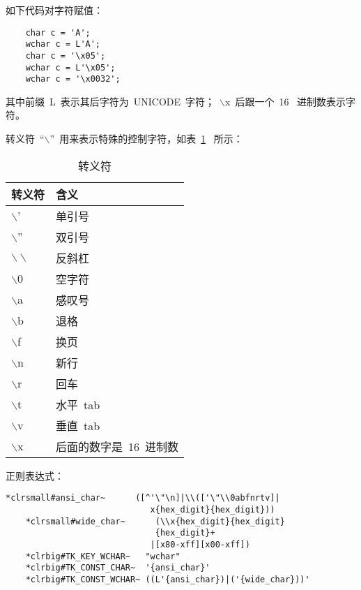 如下代码对字符赋值：


\ttfamily
\begin{lstlisting}
    char c = 'A';
    wchar c = L'A';
    char c = '\x05';
    wchar c = L'\x05';
    wchar c = '\x0032';
\end{lstlisting}

其中前缀~L~表示其后字符为~UNICODE~字符；~$\backslash$x~后跟一个~16~
进制数表示字符。

转义符~``$\backslash$''~用来表示特殊的控制字符，如表~\ref{tab_esc}~
所示：

\begin{table}[h]
  \centering
  \caption{转义符}\label{tab_esc}
  \vspace{1.5ex}
\begin{tabular}{|l|l|}
  \hline
  \textbf{转义符} & \textbf{含义} \\
  \hline\hline
  $\backslash$' & 单引号 \\
  \hline
  $\backslash$'' & 双引号 \\
  \hline
  $\backslash\backslash$ & 反斜杠 \\
  \hline
  $\backslash$0 & 空字符 \\
  \hline
  $\backslash$a & 感叹号 \\
  \hline
  $\backslash$b & 退格 \\
  \hline
  $\backslash$f & 换页 \\
  \hline
  $\backslash$n & 新行 \\
  \hline
  $\backslash$r & 回车 \\
  \hline
  $\backslash$t & 水平~tab~ \\
  \hline
  $\backslash$v & 垂直~tab~ \\
  \hline
  $\backslash$x & 后面的数字是~16~进制数 \\
  \hline
\end{tabular}

\end{table}

正则表达式：

\begin{Verbatim}[frame=single, commandchars=*\#\~]
    *clrsmall#ansi_char~      ([^'\"\n]|\\(['\"\\0abfnrtv]|
                             x{hex_digit}{hex_digit}))
    *clrsmall#wide_char~      (\\x{hex_digit}{hex_digit}
                              {hex_digit}+
                             |[x80-xff][x00-xff])
    *clrbig#TK_KEY_WCHAR~   "wchar"
    *clrbig#TK_CONST_CHAR~  '{ansi_char}'
    *clrbig#TK_CONST_WCHAR~ ((L'{ansi_char})|('{wide_char}))'
\end{Verbatim}

